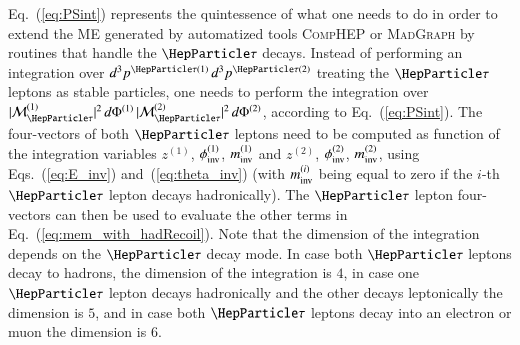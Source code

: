 Eq.~(\ref{eq:PSint}) represents the quintessence of what one needs to do
in order to extend the ME generated by automatized tools
\textsc{CompHEP} or \textsc{MadGraph}
by routines that handle the $\Pgt$ decays.
Instead of performing an integration over $d^{3}p^{\Pgt(1)} \,
d^{3}p^{\Pgt(2)}$ treating the $\Pgt$ leptons as stable particles,
one needs to perform the integration over $\vert
\mathcal{M}^{(1)}_{\Pgt} \vert^{2} \, d\Phi^{(1)} \, \vert
\mathcal{M}^{(2)}_{\Pgt} \vert^{2} \, d\Phi^{(2)}$, according to
Eq.~(\ref{eq:PSint}).
The four-vectors of both $\Pgt$ leptons need to be computed as
function of the integration variables $z^{(1)}$, $\phi_{\textrm{inv}}^{(1)}$,
$m_{\textrm{inv}}^{(1)}$ and $z^{(2)}$, $\phi_{\textrm{inv}}^{(2)}$,
$m_{\textrm{inv}}^{(2)}$, using Eqs.~(\ref{eq:E_inv}) and~(\ref{eq:theta_inv})
(with $m_{\textrm{inv}}^{(i)}$ being equal to zero if the $i$-th $\Pgt$ lepton
decays hadronically).
The $\Pgt$ lepton four-vectors can then be used to evaluate the other
terms in Eq.~(\ref{eq:mem_with_hadRecoil}).
Note that the dimension of the integration depends on the $\Pgt$ decay
mode.
In case both $\Pgt$ leptons decay to hadrons, the dimension of the
integration is $4$, in case one $\Pgt$ lepton decays hadronically and
the other decays leptonically the dimension is $5$, and in case both
$\Pgt$ leptons decay into an electron or muon the dimension is $6$.
 
